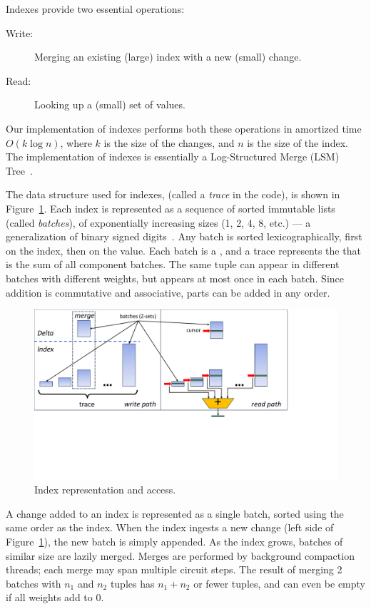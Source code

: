 Indexes provide two essential operations:
\begin{description}
\item[Write:] Merging an existing (large) index with a new (small) change.
\item[Read:] Looking up a (small) set of values.
\end{description}

Our implementation of indexes performs both these operations in
amortized time $O(k \log n)$, where $k$ is the size of the changes,
and $n$ is the size of the index.  The implementation of indexes is
essentially a Log-Structured Merge (LSM) Tree~\cite{oneil-ai96}.

The data structure used for indexes, (called a \emph{trace} in the
code), is shown in Figure~\ref{fig:trace}.  Each index is represented
as a sequence of sorted immutable lists (called \emph{batches}), of
exponentially increasing sizes (1, 2, 4, 8, etc.) --- a generalization
of binary signed digits~\cite{signed-digits}.  Any batch is sorted
lexicographically, first on the index, then on the value.  Each batch
is a \zr, and a trace represents the \zr that is the sum of all
component batches.  The same tuple can appear in different batches
with different weights, but appears at most once in each batch.  Since
addition is commutative and associative, parts can be added in any
order.

\begin{figure}[h]
  \begin{center}
    \includegraphics[trim={0 2.9in 2.1in 0},clip,scale=.27]{trace.pdf}
    \caption{\label{fig:trace}Index representation and access.}
  \end{center}
\end{figure}

A change added to an index is represented as a single batch, sorted
using the same order as the index.  When the index ingests a new
change (left side of Figure~\ref{fig:trace}), the new batch is simply
appended.  As the index grows, batches of similar size are lazily
merged.  Merges are performed by background compaction threads; each
merge may span multiple circuit steps.  The result of merging 2
batches with \(n_1\) and \(n_2\) tuples has \(n_1 + n_2\) or fewer
tuples, and can even be empty if all weights add to 0.

